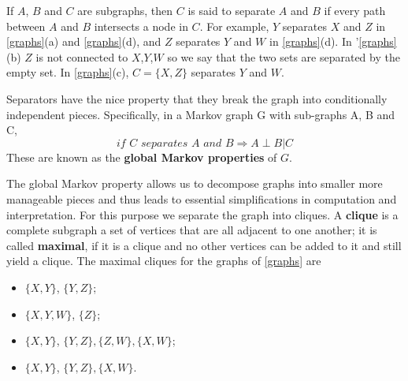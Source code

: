 If $A$, $B$ and $C$ are subgraphs, then $C$ is said to separate $A$ and $B$ if every path between $A$ and $B$ intersects a node in $C$. For example, $Y$ separates $X$ and $Z$ in \autoref{graphs}(a) and \autoref{graphs}(d), and $Z$ separates $Y$ and $W$ in \autoref{graphs}(d). In '\autoref{graphs}(b) $Z$ is not connected to $X$,$Y$,$W$ so we say that the two sets are separated by the empty set. In \autoref{graphs}(c), $C = \{X,Z\}$ separates $Y$ and $W$.

Separators have the nice property that they break the graph into conditionally independent pieces. Specifically, in a Markov graph G with sub-graphs A, B and C,
\begin{equation}
\textit{if $C$ separates $A$ and $B$} \Rightarrow A\perp B|C
\end{equation}
These are known as the \textbf{global Markov properties} of $G$.

The global Markov property allows us to decompose graphs into smaller more manageable pieces and thus leads to essential simplifications in computation and interpretation. For this purpose we separate the graph into cliques. A \textbf{clique} is a complete subgraph a set of vertices that are all adjacent to one another; it is called \textbf{maximal}, if it is a clique and no other vertices can be added to it and still yield a clique. The maximal cliques for the graphs of \autoref{graphs} are
\begin{itemize}
\item $\{X, Y\}$, $\{Y, Z\}$;
\item $\{X, Y, W\}$, $\{Z\}$;
\item $\{X, Y\}$, $\{Y, Z\}, \{Z, W\},\{X, W\}$;
\item $\{X, Y\}$, $\{Y, Z\}, \{X, W\}$.
\end{itemize}

